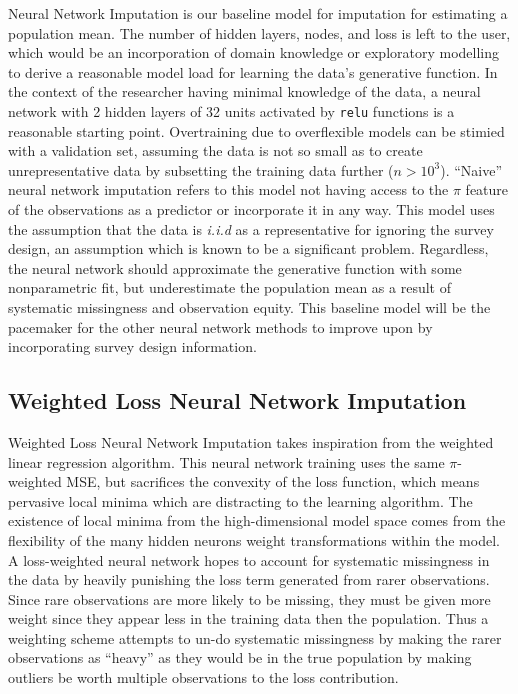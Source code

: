 \documentclass[12pt,twoside]{reedthesis}
\begin{document}
Neural Network Imputation is our baseline model for imputation for
estimating a population mean. The number of hidden layers, nodes, and
loss is left to the user, which would be an incorporation of domain
knowledge or exploratory modelling to derive a reasonable model load for
learning the data's generative function. In the context of the
researcher having minimal knowledge of the data, a neural network with 2
hidden layers of 32 units activated by \texttt{relu} functions is a
reasonable starting point. Overtraining due to overflexible models can
be stimied with a validation set, assuming the data is not so small as
to create unrepresentative data by subsetting the training data further
(\(n > 10^3\)). ``Naive'' neural network imputation refers to this model
not having access to the \(\pi\) feature of the observations as a
predictor or incorporate it in any way. This model uses the assumption
that the data is \emph{i.i.d} as a representative for ignoring the
survey design, an assumption which is known to be a significant problem.
Regardless, the neural network should approximate the generative
function with some nonparametric fit, but underestimate the population
mean as a result of systematic missingness and observation equity. This
baseline model will be the pacemaker for the other neural network
methods to improve upon by incorporating survey design information.

\subsection{Weighted Loss Neural Network
Imputation}\label{weighted-loss-neural-network-imputation}

Weighted Loss Neural Network Imputation takes inspiration from the
weighted linear regression algorithm. This neural network training uses
the same \(\pi\)-weighted MSE, but sacrifices the convexity of the loss
function, which means pervasive local minima which are distracting to
the learning algorithm. The existence of local minima from the
high-dimensional model space comes from the flexibility of the many
hidden neurons weight transformations within the model. A loss-weighted
neural network hopes to account for systematic missingness in the data
by heavily punishing the loss term generated from rarer observations.
Since rare observations are more likely to be missing, they must be
given more weight since they appear less in the training data then the
population. Thus a weighting scheme attempts to un-do systematic
missingness by making the rarer observations as ``heavy'' as they would
be in the true population by making outliers be worth multiple
observations to the loss contribution.
\end{document}
